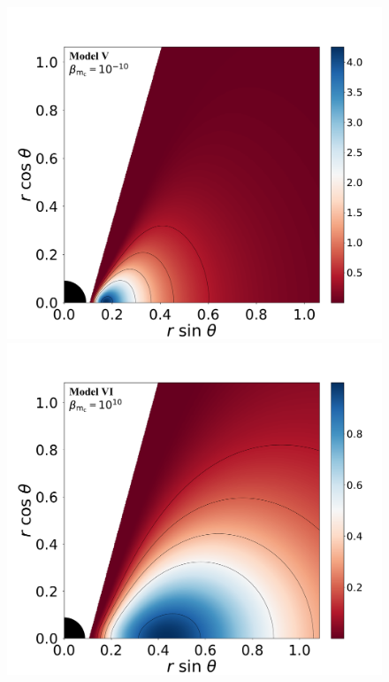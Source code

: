 \documentclass[twocolumn,aps,showpacs,showkeys,prd,superscriptaddress,byrevtex, amsmath]{revtex4-1}
\begin{document}
\begin{figure}
\includegraphics[scale=0.14]{figures/fig2_V__10.pdf}
\\
\includegraphics[scale=0.14]{figures/fig2_VI_10.pdf}
\hspace{-0.3cm}

\end{figure}
\end{document}
